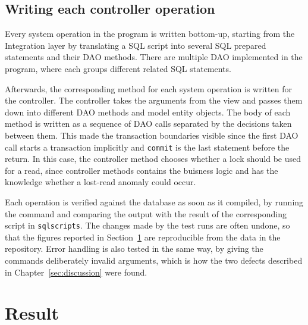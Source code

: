 \documentclass[a4paper]{scrartcl}
\renewcommand{\_}{\textunderscore\allowbreak}
\begin{document}


\subsection{Writing each controller operation}

Every system operation in the program is written bottom-up, starting from the Integration layer by translating a SQL script into several SQL prepared statements and their DAO methods. There are multiple DAO implemented in the program, where each groups different related SQL statements.

Afterwards, the corresponding method for each system operation is written for the controller. The controller takes the arguments from the view and passes them down into different DAO methods and model entity objects. The body of each method is written as a sequence of DAO calls separated by the decisions taken between them. This made the transaction boundaries visible since the first DAO call starts a transaction implicitly and \texttt{commit} is the last statement before the return. In this case, the controller method chooses whether a lock should be used for a read, since controller methods contains the buisness logic and has the knowledge whether a lost-read anomaly could occur.

Each operation is verified against the database as soon as it compiled, by running the command and comparing the output with the result of the corresponding script in \texttt{sql\_scripts}. The changes made by the test runs are often undone, so that the figures reported in Section~\ref{sec:result} are reproducible from the data in the repository. Error handling is also tested in the same way, by giving the commands deliberately invalid arguments, which is how the two defects described in Chapter~\ref{sec:discussion} were found.


\section{Result}
\label{sec:result}
\end{document}
